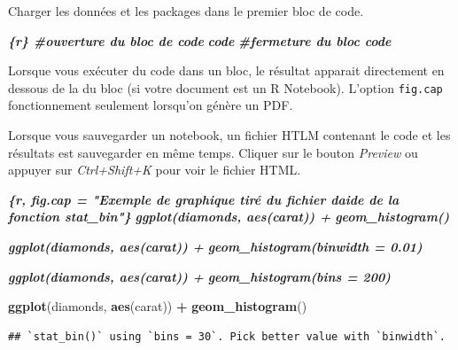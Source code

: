 \documentclass[
  12pt,
]{book}
\newenvironment{Shaded}{\begin{snugshade}}{\end{snugshade}}
\newcommand{\InformationTok}[1]{\textcolor[rgb]{0.56,0.35,0.01}{\textbf{\textit{#1}}}}
\newcommand{\KeywordTok}[1]{\textcolor[rgb]{0.13,0.29,0.53}{\textbf{#1}}}
\newcommand{\NormalTok}[1]{#1}
\newcommand{\OperatorTok}[1]{\textcolor[rgb]{0.81,0.36,0.00}{\textbf{#1}}}
\newcommand{\StringTok}[1]{\textcolor[rgb]{0.31,0.60,0.02}{#1}}
\begin{document}
Charger les données et les packages dans le premier bloc de code.

\begin{Shaded}
\begin{Highlighting}[]
\InformationTok{\textasciigrave{}\textasciigrave{}\textasciigrave{}\{r\} \#ouverture du bloc de code}
\InformationTok{code}
\InformationTok{\textasciigrave{}\textasciigrave{}\textasciigrave{} \#fermeture du bloc code}
\end{Highlighting}
\end{Shaded}

Lorsque vous exécuter du code dans un bloc, le résultat apparait directement en dessous de la du bloc (si votre document est un R Notebook).
L'option \texttt{fig.cap} fonctionnement seulement lorsqu'on génère un PDF.

Lorsque vous sauvegarder un notebook, un fichier HTLM contenant le code et les résultats est sauvegarder en même temps. Cliquer sur le bouton \emph{Preview} ou appuyer sur \emph{Ctrl+Shift+K} pour voir le fichier HTML.

\begin{Shaded}
\begin{Highlighting}[]
\InformationTok{\textasciigrave{}\textasciigrave{}\textasciigrave{}\{r, fig.cap = "Exemple de graphique tiré du fichier d\textquotesingle{}aide de la fonction stat\_bin"\}}
\InformationTok{ggplot(diamonds, aes(carat)) +}
\InformationTok{  geom\_histogram()}

\InformationTok{ggplot(diamonds, aes(carat)) +}
\InformationTok{  geom\_histogram(binwidth = 0.01)}

\InformationTok{ggplot(diamonds, aes(carat)) +}
\InformationTok{  geom\_histogram(bins = 200)}
\InformationTok{\textasciigrave{}\textasciigrave{}\textasciigrave{}}
\end{Highlighting}
\end{Shaded}

\begin{Shaded}
\begin{Highlighting}[]
\KeywordTok{ggplot}\NormalTok{(diamonds, }\KeywordTok{aes}\NormalTok{(carat)) }\OperatorTok{+}
\StringTok{  }\KeywordTok{geom\_histogram}\NormalTok{()}
\end{Highlighting}
\end{Shaded}

\begin{verbatim}
## `stat_bin()` using `bins = 30`. Pick better value with `binwidth`.
\end{verbatim}
\end{document}
